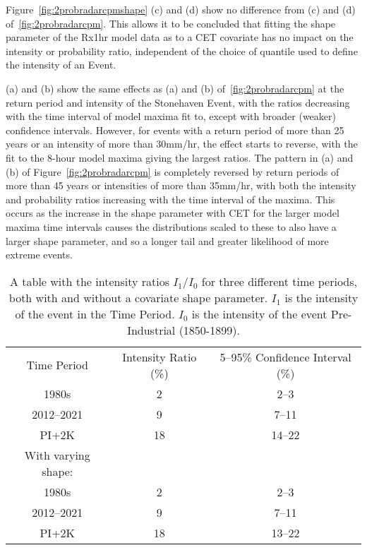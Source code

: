 Figure~\ref{fig:2probradarcpmshape} (c) and (d) show no difference from (c) and (d) of~\ref{fig:2probradarcpm}.
This allows it to be concluded that fitting the shape parameter of the Rx1hr model data as to a CET covariate has
    no impact on the intensity or probability ratio,
    independent of the choice of quantile used to define the intensity of an Event.

(a) and (b) show the same effects as (a) and (b) of~\ref{fig:2probradarcpm} at the return period and intensity
    of the Stonehaven Event,
    with the ratios decreasing with the time interval of model maxima fit to,
    except with broader (weaker) confidence intervals.
However,
    for events with a return period of more than 25 years or an intensity of more than 30mm/hr,
    the effect starts to reverse,
    with the fit to the 8-hour model maxima giving the largest ratios.
The pattern in (a) and (b) of Figure~\ref{fig:2probradarcpm} is completely reversed by return periods of
    more than 45 years or intensities of more than 35mm/hr,
    with both the intensity and probability ratios increasing with the time interval of the maxima.
This occurs as the increase in the shape parameter with CET for the larger model maxima time intervals causes the
    distributions scaled to these to also have a larger shape parameter,
    and so a longer tail and greater likelihood of more extreme events.

\begin{table}[H]
   \centering
    \begin{tabular}{c c c}
        Time Period & Intensity Ratio (\%) & 5--95\% Confidence Interval (\%) \\
        1980s & 2 & 2--3 \\
        2012--2021 & 9 & 7--11 \\
        PI+2K & 18 & 14--22 \\
        With varying shape: && \\
        1980s & 2 & 2--3 \\
        2012--2021 & 9 & 7--11 \\
        PI+2K & 18 & 13--22 \\
    \end{tabular}
    \caption[A table with the intensity ratios.]{
        A table with the intensity ratios $I_1/I_0$ for three different time periods,
        both with and without a covariate shape parameter.
    $I_1$ is the intensity of the event in the Time Period.
    $I_0$ is the intensity of the event Pre-Industrial (1850-1899).}
    \label{tab:irtable}
\end{table}

